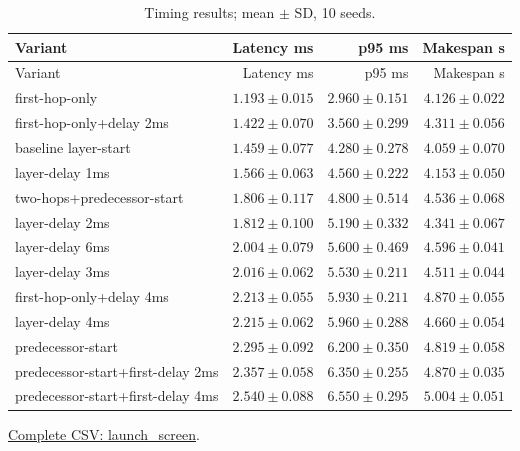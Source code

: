 \begin{center}\small
\begin{longtable}{lrrr}
\caption{Timing results; mean $\pm$ SD, 10 seeds.}\\
\toprule
Variant & Latency ms & p95 ms & Makespan s \\
\midrule\endfirsthead
\toprule
Variant & Latency ms & p95 ms & Makespan s \\
\midrule\endhead
first-hop-only & $1.193 \pm 0.015$ & $2.960 \pm 0.151$ & $4.126 \pm 0.022$ \\
first-hop-only+delay 2ms & $1.422 \pm 0.070$ & $3.560 \pm 0.299$ & $4.311 \pm 0.056$ \\
baseline layer-start & $1.459 \pm 0.077$ & $4.280 \pm 0.278$ & $4.059 \pm 0.070$ \\
layer-delay 1ms & $1.566 \pm 0.063$ & $4.560 \pm 0.222$ & $4.153 \pm 0.050$ \\
two-hops+predecessor-start & $1.806 \pm 0.117$ & $4.800 \pm 0.514$ & $4.536 \pm 0.068$ \\
layer-delay 2ms & $1.812 \pm 0.100$ & $5.190 \pm 0.332$ & $4.341 \pm 0.067$ \\
layer-delay 6ms & $2.004 \pm 0.079$ & $5.600 \pm 0.469$ & $4.596 \pm 0.041$ \\
layer-delay 3ms & $2.016 \pm 0.062$ & $5.530 \pm 0.211$ & $4.511 \pm 0.044$ \\
first-hop-only+delay 4ms & $2.213 \pm 0.055$ & $5.930 \pm 0.211$ & $4.870 \pm 0.055$ \\
layer-delay 4ms & $2.215 \pm 0.062$ & $5.960 \pm 0.288$ & $4.660 \pm 0.054$ \\
predecessor-start & $2.295 \pm 0.092$ & $6.200 \pm 0.350$ & $4.819 \pm 0.058$ \\
predecessor-start+first-delay 2ms & $2.357 \pm 0.058$ & $6.350 \pm 0.255$ & $4.870 \pm 0.035$ \\
predecessor-start+first-delay 4ms & $2.540 \pm 0.088$ & $6.550 \pm 0.295$ & $5.004 \pm 0.051$ \\
\bottomrule\end{longtable}\end{center}
{\footnotesize \href{https://github.com/sanjeevkrishnaa/Compiler-Driven-ACE/blob/codex/ace-scheduler-correctness/docs/latex/oct25_pre_golden/data/launch_screen.csv}{Complete CSV: launch\_screen}. }

